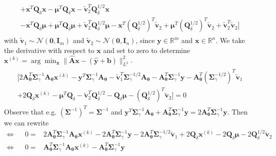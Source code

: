 \begin{mccorrection}
\begin{align*}
\begin{aligned}
		+	\bm{x}^T	\bm{Q}_{\delta} \bm{x} -	\bm{\mu}^T \bm{Q}_{\delta}\bm{x} -\tilde{\bm{v}}_2^T \bm{Q}_{\delta} ^{1/2} \bm{x}\\
		-	\bm{x}^T	\bm{Q}_{\delta}  \bm{\mu} +	\bm{\mu}^T \bm{Q}_{\delta} \bm{\mu} + \tilde{\bm{v}}_2^T \bm{Q}_{\delta} ^{1/2}\bm{\mu}
		-	\bm{x}^T	(\bm{Q}_{\delta} ^{1/2})^T \tilde{\bm{v}}_2 +	\bm{\mu}^T (\bm{Q}_{\delta}^{1/2})^T \tilde{\bm{v}}_2 +\tilde{\bm{v}}_2^T\tilde{\bm{v}}_2 \big] 
	\end{aligned}
\end{align*}
with $\tilde{\bm{v}}_1 \sim \mathcal{N}(\bm{0},  \bm{I}_m)$ and $\tilde{\bm{v}}_2 \sim \mathcal{N}(\bm{0}, \bm{I}_n )$, since $\bm{y}\in \mathbb{R}^m$ and $\bm{x}\in \mathbb{R}^n$.
We take the derivative with respect to $\bm{x}$ and set to zero to determine $\bm{x}^{(k)} = \arg \min_{\bm{x}} \lVert \hat{\bm{A}} \bm{x} - ( \hat{\bm{y}} + \bm{b} ) \rVert_{L^2}^2 $.
\begin{align*}
	\begin{aligned}
		\big[ 		2 \bm{A}_{\bm{\theta}}^T \bm{\Sigma}^{-1}_{\gamma} \bm{A}_{\bm{\theta}} \bm{x}^{(k)}    - 	 \bm{y}^T \bm{\Sigma}^{-1}_{\gamma} \bm{A}_{\bm{\theta}}   -\tilde{\bm{v}}_1^T	\bm{\Sigma}_{\gamma}^{-1/2}  \bm{A}_{\bm{\theta}} 
		- \bm{A}_{\bm{\theta}}^T \bm{\Sigma}^{-1}_{\gamma}  \bm{y}  -	 
		\bm{A}_{\bm{\theta}}^T (\bm{\Sigma}_{\gamma}^{-1/2})^T \tilde{\bm{v}}_1  \\
		+ 	2	\bm{Q}_{\delta} \bm{x}^{(k)}  -	\bm{\mu}^T \bm{Q}_{\delta} -\tilde{\bm{v}}_2^T\bm{Q}_{\delta} ^{1/2} -		\bm{Q}_{\delta}  \bm{\mu} 
		-	(\bm{Q}_{\delta} ^{1/2})^T \tilde{\bm{v}}_2\big] = 0
	\end{aligned} 
\end{align*}
Observe that e.g. $(\bm{\Sigma}^{-1})^T = \bm{\Sigma}^{-1}$ and $ \bm{y}^T \bm{\Sigma}^{-1}_{\gamma} \bm{A}_{\bm{\theta}} +  \bm{A}_{\bm{\theta}}^T \bm{\Sigma}^{-1}_{\gamma}  \bm{y}  =  2\bm{A}_{\bm{\theta}}^T \bm{\Sigma}^{-1}_{\gamma}  \bm{y}  $.
Then we can rewrite
\begin{align*}
	\Leftrightarrow&&	0=& 2 \bm{A}_{\bm{\theta}}^T \bm{\Sigma}^{-1}_{\gamma} \bm{A}_{\bm{\theta}} \bm{x}^{(k)} 
	- 2 \bm{A}_{\bm{\theta}}^T \bm{\Sigma}^{-1}_{\gamma}  \bm{y}  -	 
	2 \bm{A}_{\bm{\theta}}^T \bm{\Sigma}_{\gamma}^{-1/2} \tilde{\bm{v}}_1    
	+2	\bm{Q}_{\delta} \bm{x}^{(k)}  -		2 \bm{Q}_{\delta}  \bm{\mu} 
	-	2	\bm{Q}_{\delta} ^{1/2} \tilde{\bm{v}}_2  \\
	\Leftrightarrow&&	0 =& \bm{A}_{\bm{\theta}}^T \bm{\Sigma}^{-1}_{\gamma} \bm{A}_{\bm{\theta}} \bm{x}^{(k)}  
	-  \bm{A}_{\bm{\theta}}^T \bm{\Sigma}^{-1}_{\gamma}  \bm{y}  

\end{align*}
\end{mccorrection}

